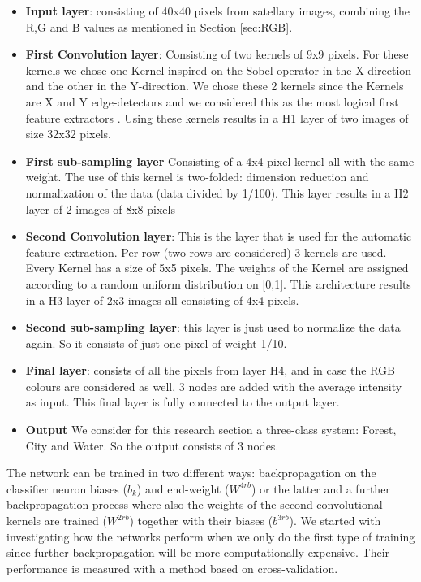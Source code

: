 \documentclass[a4paper,onecolumn]{report}
\begin{document}
\begin{itemize}
\item \textbf{Input layer}: consisting of 40x40 pixels from satellary images, combining the R,G and B values as mentioned in Section \ref{sec:RGB}.
\item \textbf{First Convolution layer}: Consisting of two kernels of 9x9 pixels. For these kernels we chose one Kernel inspired on the Sobel operator in the X-direction and the other in the Y-direction. We chose these 2 kernels since the Kernels are X and Y edge-detectors and we considered this as the most logical first feature extractors \cite{kanopoulos1988design}. Using these kernels results in a H1 layer of two images of size 32x32 pixels.
\item \textbf{First sub-sampling layer} Consisting of a 4x4 pixel kernel all with the same weight. The use of this kernel is two-folded: dimension reduction and normalization of the data (data divided by 1/100). This layer results in a H2 layer of 2 images of 8x8 pixels
\item \textbf{Second Convolution layer}: This is the layer that is used for the automatic feature extraction. Per row (two rows are considered) 3 kernels are used. Every Kernel has a size of 5x5 pixels. The weights of the Kernel are assigned according to a random uniform distribution on [0,1]. This architecture results in a H3 layer of 2x3 images all consisting of 4x4 pixels.
\item \textbf{Second sub-sampling layer}: this layer is just used to normalize the data again. So it consists of just one pixel of weight 1/10. 
\item \textbf{Final layer}: consists of all the pixels from layer H4, and in case the RGB colours are considered as well, 3 nodes are added with the average intensity as input. This final layer is fully connected to the output layer. 
\item \textbf{Output} We consider for this research section a three-class system: Forest, City and Water. So the output consists of 3 nodes.
\end{itemize} 
The network can be trained in two different ways: backpropagation on the classifier neuron biases ($b_{k}$) and end-weight ($ W^{4rb}$) or the latter and a further backpropagation process where also the weights of the second convolutional kernels are trained ($ W^{2rb} $) together with their biases ($b^{3rb}$). We started with investigating how the networks perform when we only do the first type of training since further backpropagation will be more computationally expensive. Their performance is measured with a method based on cross-validation.
\end{document}
